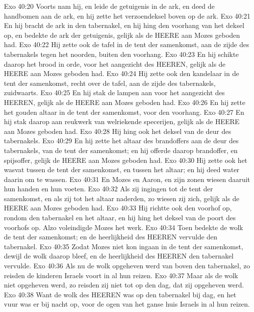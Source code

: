 Exo 40:20  Voorts nam hij, en leide de getuigenis in de ark, en deed de handbomen aan de ark, en hij zette het verzoendeksel boven op de ark.
Exo 40:21  En hij bracht de ark in den tabernakel, en hij hing den voorhang van het deksel op, en bedekte de ark der getuigenis, gelijk als de HEERE aan Mozes geboden had.
Exo 40:22  Hij zette ook de tafel in de tent der samenkomst, aan de zijde des tabernakels tegen het noorden, buiten den voorhang.
Exo 40:23  En hij schikte daarop het brood in orde, voor het aangezicht des HEEREN, gelijk als de HEERE aan Mozes geboden had.
Exo 40:24  Hij zette ook den kandelaar in de tent der samenkomst, recht over de tafel, aan de zijde des tabernakels, zuidwaarts.
Exo 40:25  En hij stak de lampen aan voor het aangezicht des HEEREN, gelijk als de HEERE aan Mozes geboden had.
Exo 40:26  En hij zette het gouden altaar in de tent der samenkomst, voor den voorhang.
Exo 40:27  En hij stak daarop aan reukwerk van welriekende specerijen, gelijk als de HEERE aan Mozes geboden had.
Exo 40:28  Hij hing ook het deksel van de deur des tabernakels.
Exo 40:29  En hij zette het altaar des brandoffers aan de deur des tabernakels, van de tent der samenkomst; en hij offerde daarop brandoffer, en spijsoffer, gelijk de HEERE aan Mozes geboden had.
Exo 40:30  Hij zette ook het wasvat tussen de tent der samenkomst, en tussen het altaar; en hij deed water daarin om te wassen.
Exo 40:31  En Mozes en Aaron, en zijn zonen wiesen daaruit hun handen en hun voeten.
Exo 40:32  Als zij ingingen tot de tent der samenkomst, en als zij tot het altaar naderden, zo wiesen zij zich, gelijk als de HEERE aan Mozes geboden had.
Exo 40:33  Hij richtte ook den voorhof op, rondom den tabernakel en het altaar, en hij hing het deksel van de poort des voorhofs op. Alzo voleindigde Mozes het werk.
Exo 40:34  Toen bedekte de wolk de tent der samenkomst; en de heerlijkheid des HEEREN vervulde den tabernakel.
Exo 40:35  Zodat Mozes niet kon ingaan in de tent der samenkomst, dewijl de wolk daarop bleef, en de heerlijkheid des HEEREN den tabernakel vervulde.
Exo 40:36  Als nu de wolk opgeheven werd van boven den tabernakel, zo reisden de kinderen Israels voort in al hun reizen.
Exo 40:37  Maar als de wolk niet opgeheven werd, zo reisden zij niet tot op den dag, dat zij opgeheven werd.
Exo 40:38  Want de wolk des HEEREN was op den tabernakel bij dag, en het vuur was er bij nacht op, voor de ogen van het ganse huis Israels in al hun reizen.



